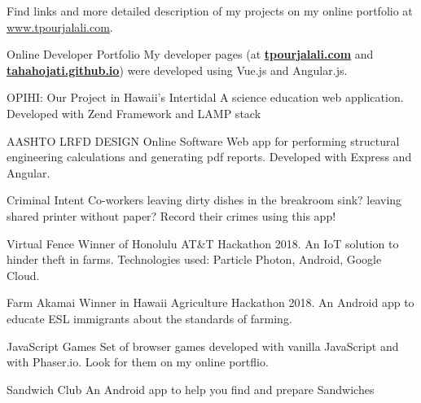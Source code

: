 
	Find links and more detailed description of my projects on my online portfolio at \mbox{\href{http://www.tpourjalali.com}{www.tpourjalali.com}}.
\begin{cventries}
	
	\cventry
	{\faLaptop\enspace Online Developer Portfolio}
	{}
	{}
	{}
	{My developer pages (at \textbf{\href{http://www.tpourjalali.com}{tpourjalali.com}} and \textbf{\href{https://tahahojati.github.io}{ tahahojati.github.io}}) were developed using Vue.js and Angular.js. }
	
	\cventry
	{\faLaptop \enspace OPIHI: Our Project in Hawaii's Intertidal}
	{}
	{}
	{}
	{A science education web application. Developed with Zend Framework and LAMP stack}
	
	\cventry
	{\faLaptop\enspace AASHTO LRFD DESIGN Online Software}
	{}
	{}
	{}
	{Web app for performing structural engineering calculations and generating pdf reports. Developed with Express and Angular. }
	
	
	
	\cventry
	{\faAndroid\enspace Criminal Intent}
	{}
	{}
	{}
	{Co-workers leaving dirty dishes in the breakroom sink? leaving shared printer without paper? Record their crimes using this app!}

	
	
	\cventry
	{\faTrophy \faAndroid \faWrench \faCloud \enspace Virtual Fence}
	{}
	{}
	{}
	{Winner of Honolulu AT{\&}T Hackathon 2018. An IoT solution to hinder theft in farms. Technologies used: Particle Photon, Android, Google Cloud.}
	
	\cventry
	{\faTrophy\faAndroid\enspace Farm Akamai}
	{}
	{}
	{}
	{Winner in Hawaii Agriculture Hackathon 2018. An Android app to educate ESL immigrants about the standards of farming.}

	\cventry
	{\faChrome\enspace JavaScript Games}
	{}
	{}
	{}
	{Set of browser games developed with vanilla JavaScript and with Phaser.io. Look for them on my online portflio.}
	
	\cventry
	{\faAndroid\enspace Sandwich Club}
	{}
	{}
	{}
	{An Android app to help you find and prepare Sandwiches}
			

\end{cventries}
